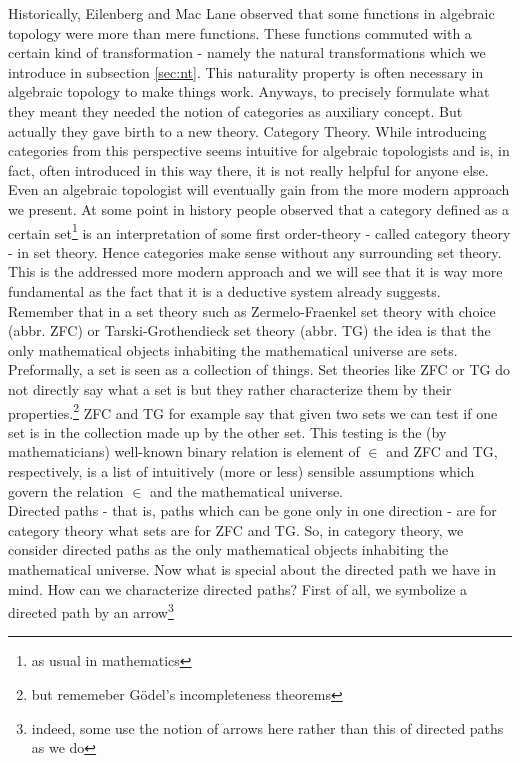 Historically, Eilenberg and Mac Lane observed that some functions in algebraic topology were more than mere functions. These functions commuted with a certain kind of transformation - namely the natural transformations which we introduce in subsection \ref{sec:nt}. This naturality property is often necessary in algebraic topology to make things work. Anyways, to precisely formulate what they meant they needed the notion of categories as auxiliary concept. But actually they gave birth to a new theory. Category Theory. While introducing categories from this perspective seems intuitive for algebraic topologists and is, in fact, often introduced in this way there, it is not really helpful for anyone else. Even an algebraic topologist will eventually gain from the more modern approach we present. At some point in history people observed that a category defined as a certain set\footnote{as usual in mathematics} is an interpretation of some first order-theory - called category theory - in set theory. Hence categories make sense without any surrounding set theory. This is the addressed more modern approach and we will see that it is way more fundamental as the fact that it is a deductive system already suggests.
\\
Remember that in a set theory such as Zermelo-Fraenkel set theory with choice (abbr. ZFC) or Tarski-Grothendieck set theory (abbr. TG) the idea is that the only mathematical objects inhabiting the mathematical universe are sets. Preformally, a set is seen as a collection of things. Set theories like ZFC or TG do not directly say what a set is but they rather characterize them by their properties.\footnote{but rememeber G\"odel's incompleteness theorems} ZFC and TG for example say that given two sets we can test if one set is in the collection made up by the other set. This testing is the (by mathematicians) well-known binary relation {\glqq}is element of{\grqq} $\in$ and ZFC and TG, respectively, is a list of intuitively (more or less) sensible assumptions which govern the relation $\in$ and the mathematical universe.
\\
Directed paths - that is, paths which can be gone only in one direction - are for category theory what sets are for ZFC and TG. So, in category theory, we consider directed paths as the only mathematical objects inhabiting the mathematical universe. Now what is special about the directed path we have in mind. How can we characterize directed paths? First of all, we symbolize a directed path by an arrow\footnote{indeed, some use the notion of arrows here rather than this of directed paths as we do}
